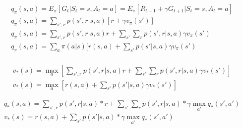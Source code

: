 \documentclass[11pt]{article}
\begin{document}
    \begin{equation}
        \begin{split}
            q_{\pi} (s, a) = E_{\pi} [G_t | S_t = s, A_t = a] = E_{\pi} [ R_{t+1} + \gamma G_{t+1} | S_t = s , A_t = a] \\
            q_{\pi} (s, a) = \sum_{s',r} p(s',r|s,a) [r+\gamma v_\pi(s')] \\
            q_{\pi} (s, a) = \sum_{s',r} p(s',r|s,a) r + \sum_{s'}\sum_{r} p(s',r|s,a) \gamma v_\pi(s') \\
            q_{\pi} (s, a) = \sum_{a} \pi(a|s) [r(s,a) + \sum_{s'} p(s'|s,a) \gamma v_\pi(s') \\
        \end{split}
    \end{equation}

    \begin{equation}
        \begin{split}
            v_* (s) = \max_{a} [\sum_{s',r} p(s',r| s, a) r+ \sum_{s'} \sum_{r} p(s',r| s, a) \gamma v_*(s')] \\
            v_* (s) = \max_{a} [ r(s,a) +  \sum_{s'} p(s'| s, a) \gamma v_*(s') ]
        \end{split}
    \end{equation}

    \begin{equation}
        \begin{split}
            q_* (s, a) =  \sum_{s',r} p(s',r| s, a) * r+ \sum_{s'} \sum_{r} p(s',r| s, a) * \gamma \max_{a'} q_*(s',a') \\
            v_* (s) = r(s, a) + \sum_{s'} p(s'| s, a) * \gamma \max_{a'} q_*(s',a')
        \end{split}
    \end{equation}
\end{document}
